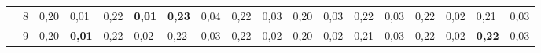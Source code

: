 \documentclass[conference]{IEEEtran}
\begin{document}
\begin{table}[]
\begin{tabular}{|cl|ll|ll|ll|ll|ll|ll|ll|ll|}
		\multicolumn{1}{|c|}{}                    & 8 & \multicolumn{1}{l|}{0,20} & 0,01          & \multicolumn{1}{l|}{0,22}          & \textbf{0,01} & \multicolumn{1}{l|}{\textbf{0,23}} & 0,04 & \multicolumn{1}{l|}{0,22}          & 0,03 & \multicolumn{1}{l|}{0,20}                 & 0,03 & \multicolumn{1}{l|}{0,22} & 0,03 & \multicolumn{1}{l|}{0,22}          & 0,02          & \multicolumn{1}{l|}{0,21}          & 0,03          \\ \cline{2-18} 
		\multicolumn{1}{|c|}{}                    & 9 & \multicolumn{1}{l|}{0,20} & \textbf{0,01} & \multicolumn{1}{l|}{0,22}          & 0,02          & \multicolumn{1}{l|}{0,22}          & 0,03 & \multicolumn{1}{l|}{0,22}          & 0,02 & \multicolumn{1}{l|}{0,20}                 & 0,02 & \multicolumn{1}{l|}{0,21} & 0,03 & \multicolumn{1}{l|}{0,22}          & 0,02          & \multicolumn{1}{l|}{\textbf{0,22}} & 0,03          \\ \hline
	\end{tabular}
\end{table}
\end{document}
